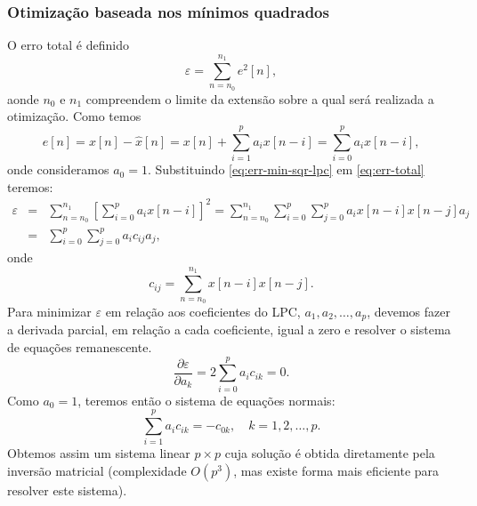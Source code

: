 \begin{frame}[allowframebreaks]
  \frametitle{Otimização baseada nos mínimos quadrados}
  O erro total é definido
  \begin{equation}
  \label{eq:err-total}
  \varepsilon = \sum_{n=n_0}^{n_1} e^2[n] ,
  \end{equation}
  aonde $n_0$ e $n_1$ compreendem o limite da extensão sobre a qual será realizada a otimização.
  Como temos
  \begin{equation}
  \label{eq:err-min-sqr-lpc}
  e[n] = x[n] - \hat{x}[n] = x[n] + \sum_{i=1}^p a_i x[n-i] = \sum_{i=0}^p a_i x[n-i] ,
  \end{equation}
  onde consideramos $a_0 = 1$.
  Substituindo \ref{eq:err-min-sqr-lpc} em \ref{eq:err-total} teremos:
  \begin{eqnarray}
  \varepsilon &=& \sum_{n=n_0}^{n_1} \left[ \sum_{i=0}^p a_i x[n-i] \right]^2 = \sum_{n=n_0}^{n_1} \sum_{i=0}^p \sum_{j=0}^p a_i x[n-i] x[n-j] a_j  \nonumber \\
              &=& \sum_{i=0}^p \sum_{j=0}^p a_i c_{ij} a_j ,
  \end{eqnarray}
  onde
  \begin{equation}
  c_{ij} = \sum_{n=n_0}^{n_1} x[n-i] x[n-j] .
  \end{equation}
  Para minimizar $\varepsilon$ em relação aos coeficientes do LPC, $a_1, a_2, \ldots, a_p$,
  devemos fazer a derivada parcial, em relação a cada coeficiente, igual a zero e resolver o sistema
  de equações remanescente.
  \begin{equation}
  \frac{\partial \varepsilon}{\partial a_k} = 2 \sum_{i=0}^p a_i c_{ik} = 0 .
  \end{equation}
  Como $a_0=1$, teremos então o sistema de equações normais:
  \begin{equation}
  \sum_{i=1}^p a_i c_{ik} = - c_{0k} , \quad k=1,2,\ldots,p .
  \end{equation}
  Obtemos assim um sistema linear $p\times p$ cuja solução é obtida diretamente pela inversão matricial
  (complexidade $O(p^3)$, mas existe forma mais eficiente para resolver este sistema).
\end{frame}

